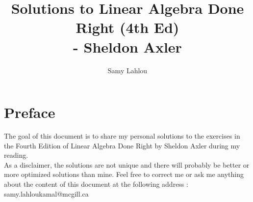 \documentclass[12pt, oneside]{book}
\title{Solutions to Linear Algebra Done Right (4th Ed)
\\ - Sheldon Axler}
\author{Samy Lahlou}
\newcounter{exercise}[section] %
\begin{document}
\maketitle

\chapter*{Preface}

The goal of this document is to share my personal solutions to the exercises in the Fourth Edition of Linear Algebra Done Right by Sheldon Axler during my reading. \\ 
As a disclaimer, the solutions are not unique and there will probably be better or more optimized solutions than mine. Feel free to correct me or ask me anything about the content of this document at the following address : samy.lahloukamal@mcgill.ca

\tableofcontents















\end{document}
